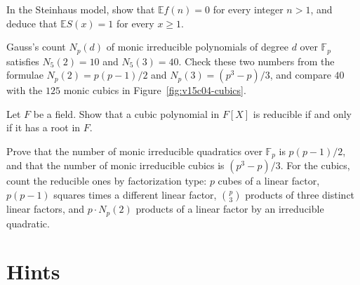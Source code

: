 \begin{exercise}[$\star$]\label{ex:v15-04-1}
In the Steinhaus model, show that \(\mathbb Ef(n)=0\) for every integer \(n>1\), and deduce that \(\mathbb ES(x)=1\) for every \(x\ge1\).
\end{exercise}

\begin{exercise}[$\star$]\label{ex:v15-04-2}
Gauss's count \(N_p(d)\) of monic irreducible polynomials of degree \(d\) over \(\mathbb F_p\) satisfies \(N_5(2)=10\) and \(N_5(3)=40\). Check these two numbers from the formulae \(N_p(2)=p(p-1)/2\) and \(N_p(3)=(p^3-p)/3\), and compare \(40\) with the \(125\) monic cubics in Figure~\ref{fig:v15c04-cubics}.
\end{exercise}

\begin{exercise}[$\star\star$]\label{ex:v15-04-3}
Let \(F\) be a field. Show that a cubic polynomial in \(F[X]\) is reducible if and only if it has a root in \(F\).
\end{exercise}

\begin{exercise}[$\star\star\star$]\label{ex:v15-04-4}
Prove that the number of monic irreducible quadratics over \(\mathbb F_p\) is \(p(p-1)/2\), and that the number of monic irreducible cubics is \((p^3-p)/3\). For the cubics, count the reducible ones by factorization type: \(p\) cubes of a linear factor, \(p(p-1)\) squares times a different linear factor, \(\binom p3\) products of three distinct linear factors, and \(p\cdot N_p(2)\) products of a linear factor by an irreducible quadratic.
\end{exercise}

\section{Hints}

